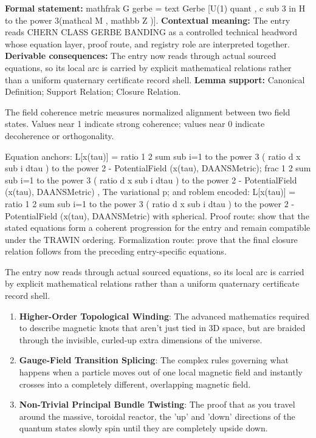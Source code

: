 \begingroup\footnotesize\setlength{\emergencystretch}{3em}\sloppy
\textbf{Formal statement:} mathfrak G gerbe = text Gerbe [U(1) quant , c sub 3 in H to the power 3(mathcal M , mathbb Z )]. \textbf{Contextual meaning:} The entry reads CHERN CLASS GERBE BANDING as a controlled technical headword whose equation layer, proof route, and registry role are interpreted together. \textbf{Derivable consequences:} The entry now reads through actual sourced equations, so its local arc is carried by explicit mathematical relations rather than a uniform quaternary certificate record shell. \textbf{Lemma support:} Canonical Definition; Support Relation; Closure Relation.\par
\endgroup

The field coherence metric measures normalized alignment between two field states. Values near 1 indicate strong coherence; values near 0 indicate decoherence or orthogonality.

Equation anchors: L[x(tau)] = ratio 1 2 sum sub i=1 to the power 3 ( ratio d x sub i dtau ) to the power 2 - PotentialField (x(tau), DAANSMetric); frac 1 2 sum sub i=1 to the power 3 ( ratio d x sub i dtau ) to the power 2 - PotentialField (x(tau), DAANSMetric) , The variational p; and roblem encoded: L[x(tau)] = ratio 1 2 sum sub i=1 to the power 3 ( ratio d x sub i dtau ) to the power 2 - PotentialField (x(tau), DAANSMetric) with spherical. Proof route: show that the stated equations form a coherent progression for the entry and remain compatible under the TRAWIN ordering. Formalization route: prove that the final closure relation follows from the preceding entry-specific equations.

The entry now reads through actual sourced equations, so its local arc is carried by explicit mathematical relations rather than a uniform quaternary certificate record shell.
\endgroup

\begin{enumerate}[leftmargin=1.6em,itemsep=6pt,topsep=4pt]
\item \textbf{Higher-Order Topological Winding}: The advanced mathematics required to describe magnetic knots that aren't just tied in 3D space, but are braided through the invisible, curled-up extra dimensions of the universe.
\item \textbf{Gauge-Field Transition Splicing}: The complex rules governing what happens when a particle moves out of one local magnetic field and instantly crosses into a completely different, overlapping magnetic field.
\item \textbf{Non-Trivial Principal Bundle Twisting}: The proof that as you travel around the massive, toroidal reactor, the 'up' and 'down' directions of the quantum states slowly spin until they are completely upside down.
\end{enumerate}

